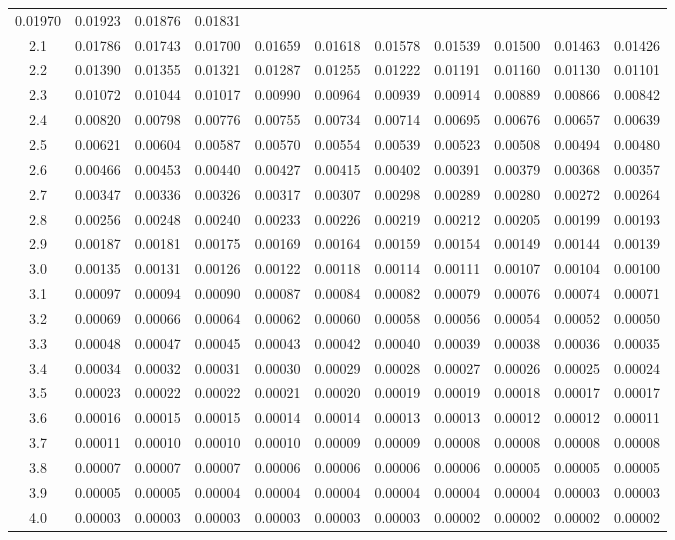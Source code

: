 \documentclass[]{book}
\theoremstyle{plain}
\theoremstyle{definition}
\theoremstyle{definition} %
\begin{document}
\begin{longtable}[]{@{}ccccccccccc@{}}
0.01970 & 0.01923 & 0.01876 & 0.01831\tabularnewline
2.1 & 0.01786 & 0.01743 & 0.01700 & 0.01659 & 0.01618 & 0.01578 &
0.01539 & 0.01500 & 0.01463 & 0.01426\tabularnewline
2.2 & 0.01390 & 0.01355 & 0.01321 & 0.01287 & 0.01255 & 0.01222 &
0.01191 & 0.01160 & 0.01130 & 0.01101\tabularnewline
2.3 & 0.01072 & 0.01044 & 0.01017 & 0.00990 & 0.00964 & 0.00939 &
0.00914 & 0.00889 & 0.00866 & 0.00842\tabularnewline
2.4 & 0.00820 & 0.00798 & 0.00776 & 0.00755 & 0.00734 & 0.00714 &
0.00695 & 0.00676 & 0.00657 & 0.00639\tabularnewline
2.5 & 0.00621 & 0.00604 & 0.00587 & 0.00570 & 0.00554 & 0.00539 &
0.00523 & 0.00508 & 0.00494 & 0.00480\tabularnewline
2.6 & 0.00466 & 0.00453 & 0.00440 & 0.00427 & 0.00415 & 0.00402 &
0.00391 & 0.00379 & 0.00368 & 0.00357\tabularnewline
2.7 & 0.00347 & 0.00336 & 0.00326 & 0.00317 & 0.00307 & 0.00298 &
0.00289 & 0.00280 & 0.00272 & 0.00264\tabularnewline
2.8 & 0.00256 & 0.00248 & 0.00240 & 0.00233 & 0.00226 & 0.00219 &
0.00212 & 0.00205 & 0.00199 & 0.00193\tabularnewline
2.9 & 0.00187 & 0.00181 & 0.00175 & 0.00169 & 0.00164 & 0.00159 &
0.00154 & 0.00149 & 0.00144 & 0.00139\tabularnewline
3.0 & 0.00135 & 0.00131 & 0.00126 & 0.00122 & 0.00118 & 0.00114 &
0.00111 & 0.00107 & 0.00104 & 0.00100\tabularnewline
3.1 & 0.00097 & 0.00094 & 0.00090 & 0.00087 & 0.00084 & 0.00082 &
0.00079 & 0.00076 & 0.00074 & 0.00071\tabularnewline
3.2 & 0.00069 & 0.00066 & 0.00064 & 0.00062 & 0.00060 & 0.00058 &
0.00056 & 0.00054 & 0.00052 & 0.00050\tabularnewline
3.3 & 0.00048 & 0.00047 & 0.00045 & 0.00043 & 0.00042 & 0.00040 &
0.00039 & 0.00038 & 0.00036 & 0.00035\tabularnewline
3.4 & 0.00034 & 0.00032 & 0.00031 & 0.00030 & 0.00029 & 0.00028 &
0.00027 & 0.00026 & 0.00025 & 0.00024\tabularnewline
3.5 & 0.00023 & 0.00022 & 0.00022 & 0.00021 & 0.00020 & 0.00019 &
0.00019 & 0.00018 & 0.00017 & 0.00017\tabularnewline
3.6 & 0.00016 & 0.00015 & 0.00015 & 0.00014 & 0.00014 & 0.00013 &
0.00013 & 0.00012 & 0.00012 & 0.00011\tabularnewline
3.7 & 0.00011 & 0.00010 & 0.00010 & 0.00010 & 0.00009 & 0.00009 &
0.00008 & 0.00008 & 0.00008 & 0.00008\tabularnewline
3.8 & 0.00007 & 0.00007 & 0.00007 & 0.00006 & 0.00006 & 0.00006 &
0.00006 & 0.00005 & 0.00005 & 0.00005\tabularnewline
3.9 & 0.00005 & 0.00005 & 0.00004 & 0.00004 & 0.00004 & 0.00004 &
0.00004 & 0.00004 & 0.00003 & 0.00003\tabularnewline
4.0 & 0.00003 & 0.00003 & 0.00003 & 0.00003 & 0.00003 & 0.00003 &
0.00002 & 0.00002 & 0.00002 & 0.00002\tabularnewline
\bottomrule
\end{longtable}
\end{document}
